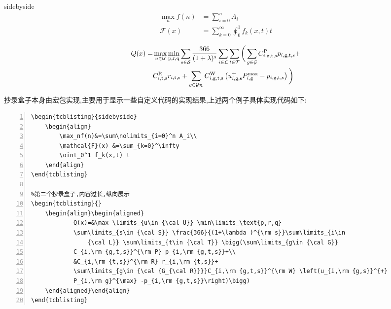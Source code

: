 \begin{tcblisting}{sidebyside}
\begin{align}
    \max_nf(n)&=\sum\nolimits_{i=0}^n A_i\\
    \mathcal{F}(x) &=\sum_{k=0}^\infty
    \oint_0^1 f_k(x,t) t
\end{align}
\end{tcblisting}

\begin{tcblisting}{}
\begin{align}\begin{aligned}
        Q(x)=&\max \limits_{u\in {\cal U}} \min\limits_\text{p,r,q}
        \sum\limits_{s\in {\cal S}} \frac{366}{(1+\lambda )^{\rm s}}\sum\limits_{i\in
            {\cal L}} \sum\limits_{t\in {\cal T}} \bigg(\sum\limits_{g\in {\cal G}}
        C_{i,\rm {g,t,s}}^{\rm P} p_{i,\rm {g,t,s}}+\\
        &C_{i,\rm {t,s}}^{\rm R} r_{i,\rm {t,s}}+
        \sum\limits_{g\in {\cal {G_{\cal R}}}}C_{i,\rm {g,t,s}}^{\rm W} \left(u_{i,\rm {g,s}}^{+}
        P_{i,\rm g}^{\max} -p_{i,\rm {g,t,s}}\right)\bigg)
\end{aligned}\end{align}
\end{tcblisting}
抄录盒子本身由宏包实现,主要用于显示一些自定义代码的实现结果,上述两个例子具体实现代码如下:

\begin{lstlisting}[backgroundcolor=\color{gray!5},framerule=1pt,frame=tb,numbers=left,
    numberstyle=\tiny\color{black},]
    %第一个抄录盒子,适合内容简短,横向展示内容
\begin{tcblisting}{sidebyside}
    \begin{align}
        \max_nf(n)&=\sum\nolimits_{i=0}^n A_i\\
        \mathcal{F}(x) &=\sum_{k=0}^\infty
        \oint_0^1 f_k(x,t) t
    \end{align}
\end{tcblisting}

%第二个抄录盒子,内容过长,纵向展示
\begin{tcblisting}{}
    \begin{align}\begin{aligned}
            Q(x)=&\max \limits_{u\in {\cal U}} \min\limits_\text{p,r,q}
            \sum\limits_{s\in {\cal S}} \frac{366}{(1+\lambda )^{\rm s}}\sum\limits_{i\in
                {\cal L}} \sum\limits_{t\in {\cal T}} \bigg(\sum\limits_{g\in {\cal G}}
            C_{i,\rm {g,t,s}}^{\rm P} p_{i,\rm {g,t,s}}+\\
            &C_{i,\rm {t,s}}^{\rm R} r_{i,\rm {t,s}}+
            \sum\limits_{g\in {\cal {G_{\cal R}}}}C_{i,\rm {g,t,s}}^{\rm W} \left(u_{i,\rm {g,s}}^{+}
            P_{i,\rm g}^{\max} -p_{i,\rm {g,t,s}}\right)\bigg)
    \end{aligned}\end{align}
\end{tcblisting}
\end{lstlisting}

